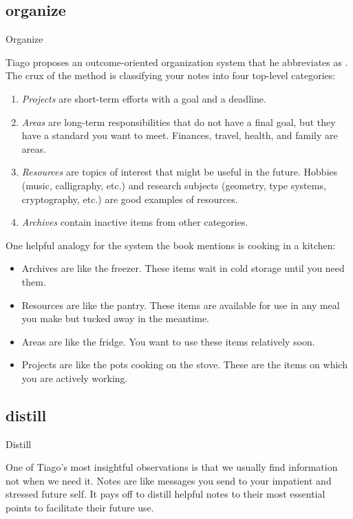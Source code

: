\documentclass{article}
\begin{document}
\subsection{organize}{Organize}

Tiago proposes an outcome-oriented organization system that he abbreviates as \href{https://fortelabs.com/blog/para/}{}.
The crux of the method is classifying your notes into four top-level categories:
\begin{enumerate}
  \item 
    \emph{Projects} are short-term efforts with a goal and a deadline.
  \item 
    \emph{Areas} are long-term responsibilities that do not have a final goal, but they have a standard you want to meet.
    Finances, travel, health, and family are areas.
  \item 
    \emph{Resources} are topics of interest that might be useful in the future.
    Hobbies (music, calligraphy, etc.) and research subjects (geometry, type systems, cryptography, etc.) are good examples of resources.
  \item 
    \emph{Archives} contain inactive items from other categories.
\end{enumerate}

One helpful analogy for the  system the book mentions is cooking in a kitchen:
\begin{itemize}
  \item Archives are like the freezer. These items wait in cold storage until you need them.
  \item Resources are like the pantry. These items are available for use in any meal you make but tucked away in the meantime.
  \item Areas are like the fridge. You want to use these items relatively soon.
  \item Projects are like the pots cooking on the stove. These are the items on which you are actively working.
\end{itemize}

\subsection{distill}{Distill}

One of Tiago's most insightful observations is that we usually find information not when we need it.
Notes are like messages you send to your impatient and stressed future self.
It pays off to distill helpful notes to their most essential points to facilitate their future use.
\end{document}
